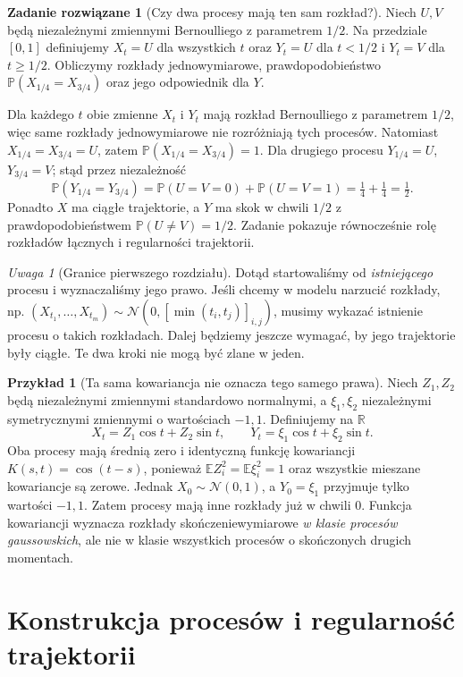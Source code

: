 \documentclass[11pt,a4paper,oneside]{report}
\numberwithin{equation}{chapter}
\theoremstyle{plain}
\theoremstyle{definition}
\newtheorem{przyklad}{Przykład}[chapter]
\newtheorem{zadanie}{Zadanie rozwiązane}[chapter]
\theoremstyle{remark}
\newtheorem{uwaga}{Uwaga}[chapter]
\newcommand{\R}{\mathbb{R}}
\newcommand{\Prob}{\mathbb{P}}
\newcommand{\E}{\mathbb{E}}
\newcommand{\Normal}{\mathcal{N}}
\begin{document}
\begin{zadanie}[Czy dwa procesy mają ten sam rozkład?]
Niech $U,V$ będą niezależnymi zmiennymi Bernoulliego z parametrem
$1/2$. Na przedziale $[0,1]$ definiujemy
$X_t=U$ dla wszystkich $t$ oraz
$Y_t=U$ dla $t<1/2$ i $Y_t=V$ dla $t\ge1/2$.
Obliczymy rozkłady jednowymiarowe, prawdopodobieństwo
$\Prob(X_{1/4}=X_{3/4})$ oraz jego odpowiednik dla $Y$.

Dla każdego $t$ obie zmienne $X_t$ i $Y_t$ mają rozkład
Bernoulliego z parametrem $1/2$, więc same rozkłady
jednowymiarowe nie rozróżniają tych procesów. Natomiast
$X_{1/4}=X_{3/4}=U$, zatem
$\Prob(X_{1/4}=X_{3/4})=1$.
Dla drugiego procesu
$Y_{1/4}=U$, $Y_{3/4}=V$; stąd przez niezależność
\[
\Prob(Y_{1/4}=Y_{3/4})
=\Prob(U=V=0)+\Prob(U=V=1)=\tfrac14+\tfrac14=\tfrac12.
\]
Ponadto $X$ ma ciągłe trajektorie, a $Y$ ma skok w chwili
$1/2$ z prawdopodobieństwem $\Prob(U\ne V)=1/2$.
Zadanie pokazuje równocześnie rolę rozkładów łącznych
i regularności trajektorii.
\end{zadanie}

\begin{uwaga}[Granice pierwszego rozdziału]
Dotąd startowaliśmy od \emph{istniejącego} procesu i wyznaczaliśmy
jego prawo. Jeśli chcemy w modelu narzucić rozkłady, np.
$(X_{t_1},\ldots,X_{t_m})\sim\Normal(0,[\min(t_i,t_j)]_{i,j})$,
musimy wykazać istnienie procesu o takich rozkładach.
Dalej będziemy jeszcze wymagać, by jego trajektorie były ciągłe.
Te dwa kroki nie mogą być zlane w jeden.
\end{uwaga}


\begin{przyklad}[Ta sama kowariancja nie oznacza tego samego prawa]
Niech $Z_1,Z_2$ będą niezależnymi zmiennymi standardowo
normalnymi, a $\xi_1,\xi_2$ niezależnymi symetrycznymi
zmiennymi o wartościach $-1,1$. Definiujemy na $\R$
\[
X_t=Z_1\cos t+Z_2\sin t,
\qquad Y_t=\xi_1\cos t+\xi_2\sin t.
\]
Oba procesy mają średnią zero i identyczną funkcję
kowariancji $K(s,t)=\cos(t-s)$, ponieważ
$\E Z_i^2=\E\xi_i^2=1$ oraz wszystkie mieszane
kowariancje są zerowe. Jednak $X_0\sim\Normal(0,1)$,
a $Y_0=\xi_1$ przyjmuje tylko wartości $-1,1$.
Zatem procesy mają inne rozkłady już w chwili $0$.
Funkcja kowariancji wyznacza rozkłady skończeniewymiarowe
\emph{w klasie procesów gaussowskich}, ale nie w klasie
wszystkich procesów o skończonych drugich momentach.
\end{przyklad}

\chapter{Konstrukcja procesów i regularność trajektorii}
\label{ch:konstrukcja}
\end{document}
